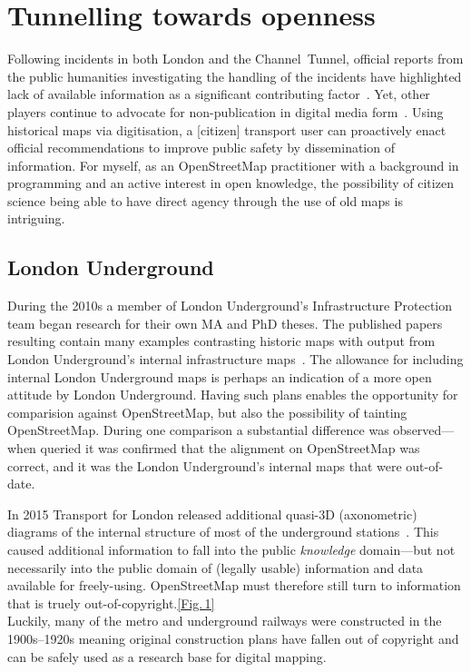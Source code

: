 \documentclass[conference,a4paper]{IEEEtran}
\begin{document}
\vspace{0.4em}
\section{Tunnelling towards openness}
Following incidents in both London and the Channel~Tunnel, official
reports from the public humanities investigating the handling of the
incidents have highlighted lack of available information as a
significant contributing factor~\cite{riab-2010,riab-2013,openstreetmap,foi-2011}. Yet,
other players continue to advocate for non-publication in digital
media form~\cite{foi-2011}. Using historical maps via digitisation, a
[citizen] transport user can proactively enact official
recommendations to improve public safety by dissemination of
information. For myself, as an OpenStreetMap
practitioner with a background in programming and an active interest
in open knowledge, the possibility of citizen science being able to
have direct agency through the use of old maps is intriguing.\par\vspace*{\fill}

\subsection{London Underground}\vspace{-0.2em}

During the 2010s a member of London Underground's Infrastructure
Protection team began research for their own MA and PhD theses.  The
published papers resulting contain many examples contrasting historic
maps with output from London Underground's internal infrastructure
maps~\cite{darroch-2012,darroch-2014}. The allowance for
including internal London Underground maps is perhaps an indication of a
more open attitude by London Underground.  Having such plans enables the opportunity for
comparision against OpenStreetMap, but also the possibility of
tainting OpenStreetMap.  During one comparison a substantial difference was observed---when queried it was confirmed that the
alignment on OpenStreetMap was correct, and it was the 
London Underground's internal maps that were out-of-date.

In 2015 Transport for London released additional quasi-{\small 3D} (axonometric) diagrams of
the internal structure of most of the underground stations~\cite{foi-2015}.
This caused additional information to fall into the public {\it knowledge}
domain---but not necessarily into the public domain of (legally usable) information and
data available for freely-using.  OpenStreetMap must therefore still
turn to information that is truely out-of-copyright.\hfill{}\hyperref[fig:south-ken-bends]{[Fig.\,1]}\\
Luckily, many of the metro and underground railways were constructed in the
1900s--1920s meaning original construction plans have
fallen out of copyright and can be safely used as a research base for digital mapping.
\end{document}
